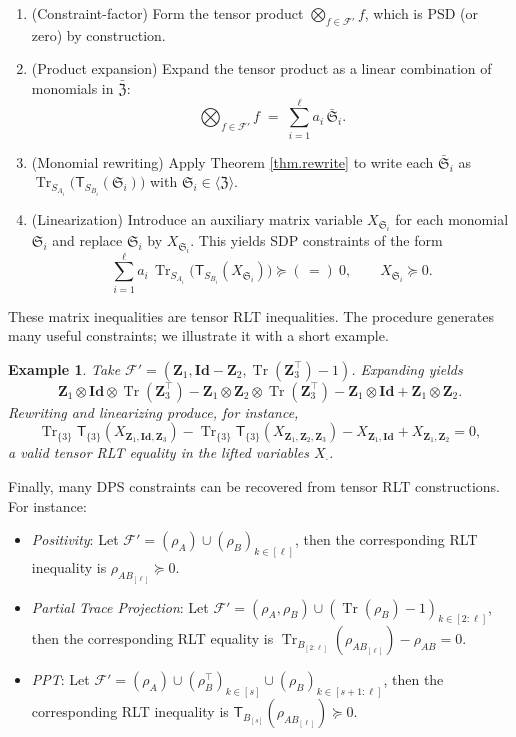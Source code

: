 \documentclass[smallextended]{svjour3}
\newtheorem{example}{Example}
\newcommand{\fS}{\mathfrak S}
\newcommand{\fZ}{\mathfrak Z}
\newcommand{\cF}{\mathcal F}
\newcommand{\Z}{\mathbf{Z}}
\newcommand{\1}{\mathbf{1}}
\newcommand{\Id}{\mathbf{Id}}
\DeclareMathOperator{\tr}{Tr}
\newcommand{\Tr}{\mathsf{T}}
\DeclareMathOperator{\mtens}{\otimes}
\DeclareMathOperator{\bmtens}{\bigotimes}
\begin{document}
\begin{enumerate}
    \item (Constraint-factor) Form the tensor product $\bmtens_{f\in\cF'} f$, which is PSD (or zero) by construction.
    \item (Product expansion) Expand the tensor product as a linear combination of monomials in $\bar{\fZ}$:
    \[
      \bmtens_{f\in\cF'} f \;=\; \sum_{i=1}^\ell a_i\,\bar{\fS}_i.
    \]
    \item (Monomial rewriting) Apply Theorem \ref{thm.rewrite} to write each $\bar{\fS}_i$ as $\tr_{S_{A_i}}\bigl(\Tr_{S_{B_i}}(\fS_i)\bigr)$ with $\fS_i\in\langle\fZ\rangle$.
    \item (Linearization) Introduce an auxiliary matrix variable $X_{\fS_i}$ for each monomial $\fS_i$ and replace $\fS_i$ by $X_{\fS_i}$. This yields SDP constraints of the form
    \[
      \sum_{i=1}^\ell a_i\,\tr_{S_{A_i}}\!\bigl(\Tr_{S_{B_i}}(X_{\fS_i})\bigr)\succeq(\,=)\ 0,\qquad X_{\fS_i}\succeq0.
    \]
\end{enumerate}

These matrix inequalities are tensor RLT inequalities. The procedure generates many useful constraints; we illustrate it with a short example.

\begin{example}
Take $\cF'=(\Z_1,\Id-\Z_2,\tr(\Z_3^\top)-1)$. Expanding yields
\[
\Z_1\mtens\Id\mtens\tr(\Z_3^\top)-\Z_1\mtens\Z_2\mtens\tr(\Z_3^\top)-\Z_1\mtens\Id+\Z_1\mtens\Z_2.
\]
Rewriting and linearizing produce, for instance,
\[
\tr_{\{3\}}\Tr_{\{3\}}(X_{\Z_1,\Id,\Z_3})
-\tr_{\{3\}}\Tr_{\{3\}}(X_{\Z_1,\Z_2,\Z_3})
- X_{\Z_1,\Id} + X_{\Z_1,\Z_2} = 0,
\]
a valid tensor RLT equality in the lifted variables $X_{\cdot}$.
\end{example}

Finally, many DPS constraints can be recovered from tensor RLT constructions. For instance:
\begin{itemize}
    \item[(a)] \textit{Positivity}: Let $\cF'=(\rho_A) \cup (\rho_B)_{k \in [\ell]}$, then the corresponding RLT inequality is $\rho_{AB_{[\ell]}} \succeq 0$.
    \item[(b)] \textit{Partial Trace Projection}: Let $\cF'=(\rho_A,\rho_B) \cup (\tr(\rho_B) - 1)_{k \in [2:\ell]}$, then the corresponding RLT equality is $   \tr_{B_{[2:\ell]}} (\rho_{AB_{[\ell]}}) - \rho_{AB} = 0$.

    \item[(c)] \textit{PPT}: Let $\cF'=(\rho_A) \cup (\rho^\top_B)_{k \in [s]} \cup (\rho_B)_{k \in [s+1:\ell]}$, then the corresponding RLT inequality is $ \Tr_{B_{[s]}}(\rho_{AB_{[\ell]}}) \succeq 0$.
\end{itemize}
\end{document}
